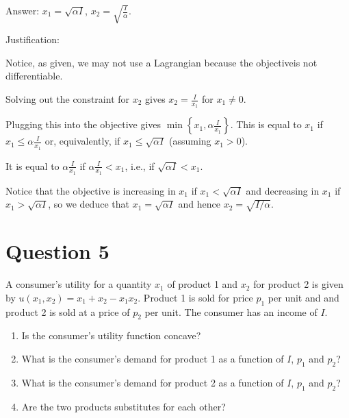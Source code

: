 \documentclass{article}
\newenvironment{solution}{\color{red}}{\color{black}}
\begin{document}
\begin{solution}
Answer: $x_1=\sqrt{\alpha I}$, $x_2=\sqrt{\frac{I}\alpha}$.

Justification: 

Notice, as given, we may not use a Lagrangian because the objectiveis not differentiable.

Solving out the constraint for $x_2$ gives $x_2 = \frac{I}{x_1}$ for $x_1 \neq 0$. 

Plugging this into the objective gives $\min\left\{ x_1,\alpha \frac{I}{x_1} \right\}$. This is equal to $x_1$ if $x_1 \leq \alpha \frac{I}{x_1}$ or, equivalently, if $x_1 \leq \sqrt{\alpha I}$ (assuming $x_1 > 0$).

It is equal to $\alpha \frac{I}{x_1}$ if $\alpha \frac{I}{x_1} < x_1$, i.e., if $\sqrt{\alpha I} < x_1$.

Notice that the objective is increasing in $x_1$ if $x_1 < \sqrt{\alpha I}$ and decreasing in $x_1$ if $x_1 > \sqrt{\alpha I}$, so we deduce that $x_1 = \sqrt{\alpha I}$ and hence $x_2 = \sqrt{I/\alpha}$. 
\end{solution}

\section*{Question 5}
A consumer's utility for a quantity $x_1$ of product 1 and $x_2$ for product 2 is given by $u(x_1, x_2) = x_1 + x_2 - x_1x_2$. Product 1 is sold for price $p_1$ per unit and and product 2 is sold at a price of $p_2$ per unit. The consumer has an income of $I$.

\begin{enumerate}
\item Is the consumer's utility function concave?
\item What is the consumer's demand for product 1 as a function of $I$, $p_1$ and $p_2$?
\item What is the consumer's demand for product 2 as a function of $I$, $p_1$ and $p_2$?
\item Are the two products substitutes for each other?
\end{enumerate}
\end{document}
